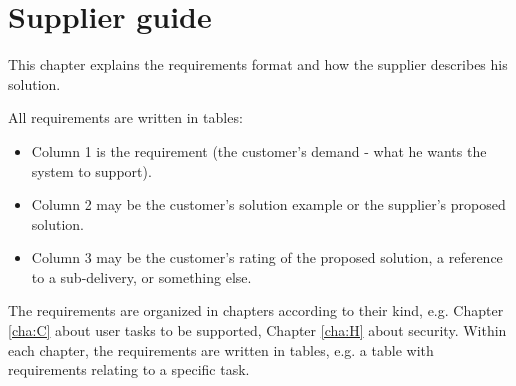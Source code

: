 \documentclass[Main]{subfiles}
\begin{document}
\section{Supplier guide}

This chapter explains the requirements format and how the supplier describes his solution.

All requirements are written in tables:
\begin{itemize}
\item Column 1 is the requirement (the customer's demand - what he wants the system to support). 

\item Column 2 may be the customer's solution example or the supplier's proposed solution.

\item Column 3 may be the customer's rating of the proposed solution, a reference to a sub-delivery, or something else.

\end{itemize}

The requirements are organized in chapters according to their kind, e.g. Chapter \ref{cha:C} about user tasks to be supported, Chapter \ref{cha:H} about security. 
Within each chapter, the requirements are written in tables, e.g. a table with requirements relating to a specific task. 
\end{document}
